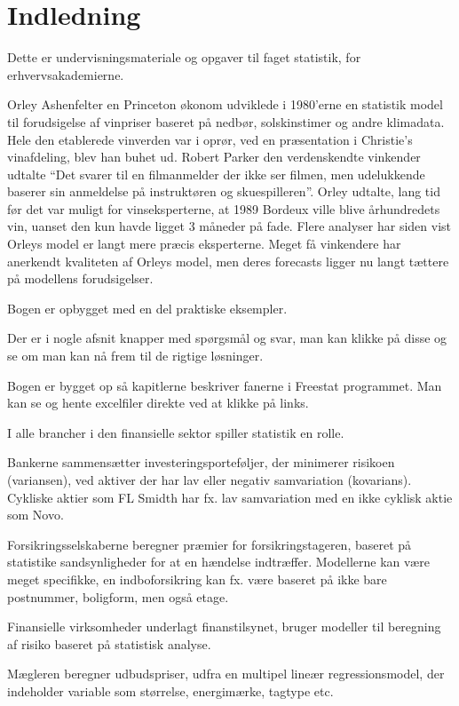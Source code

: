 \documentclass[]{book}
\begin{document}
\hypertarget{indledning}{%
\chapter{Indledning}\label{indledning}}

Dette er undervisningsmateriale og opgaver til faget statistik, for erhvervsakademierne.

Orley Ashenfelter en Princeton økonom udviklede i 1980'erne en statistik model til forudsigelse af vinpriser baseret på nedbør, solskinstimer og andre klimadata. Hele den etablerede vinverden var i oprør, ved en præsentation i Christie's vinafdeling, blev han buhet ud. Robert Parker den verdenskendte vinkender udtalte ``Det svarer til en filmanmelder der ikke ser filmen, men udelukkende baserer sin anmeldelse på instruktøren og skuespilleren''. Orley udtalte, lang tid før det var muligt for vinseksperterne, at 1989 Bordeux ville blive århundredets vin, uanset den kun havde ligget 3 måneder på fade. Flere analyser har siden vist Orleys model er langt mere præcis eksperterne. Meget få vinkendere har anerkendt kvaliteten af Orleys model, men deres forecasts ligger nu langt tættere på modellens forudsigelser.

Bogen er opbygget med en del praktiske eksempler.

Der er i nogle afsnit knapper med spørgsmål og svar, man kan klikke på disse og se om man kan nå frem til de rigtige løsninger.

Bogen er bygget op så kapitlerne beskriver fanerne i Freestat programmet. Man kan se og hente excelfiler direkte ved at klikke på links.

I alle brancher i den finansielle sektor spiller statistik en rolle.

Bankerne sammensætter investeringsporteføljer, der minimerer risikoen (variansen), ved aktiver der har lav eller negativ samvariation (kovarians). Cykliske aktier som FL Smidth har fx. lav samvariation med en ikke cyklisk aktie som Novo.

Forsikringsselskaberne beregner præmier for forsikringstageren, baseret på statistike sandsynligheder for at en hændelse indtræffer. Modellerne kan være meget specifikke, en indboforsikring kan fx. være baseret på ikke bare postnummer, boligform, men også etage.

Finansielle virksomheder underlagt finanstilsynet, bruger modeller til beregning af risiko baseret på statistisk analyse.

Mægleren beregner udbudspriser, udfra en multipel lineær regressionsmodel, der indeholder variable som størrelse, energimærke, tagtype etc.
\end{document}
